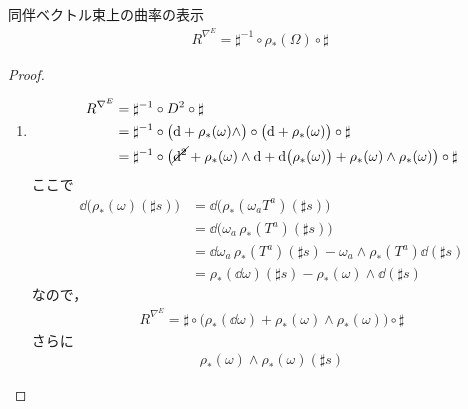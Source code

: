 \documentclass[TQFT_main]{subfiles}
\begin{document}
\begin{mytheo}[label=thm:curvature-assoc]{同伴ベクトル束上の曲率の表示}
    \begin{align}
        R^{\nabla^E} = \sharp^{-1} \circ \rho_*(\Omega) \circ \sharp
    \end{align}
\end{mytheo}

\begin{proof}
    \begin{enumerate}
        \item 
        \begin{align}
            R^{\nabla^E}
            &= \sharp^{-1} \circ D^2 \circ \sharp \\
            &= \sharp^{-1} \circ \bigl( \dd + \rho_*(\omega) \wedge \bigr)\circ \bigl( \dd + \rho_*(\omega)\bigr) \circ \sharp \\
            &= \sharp^{-1} \circ \bigl( \cancel{\dd^2} + \rho_*(\omega) \wedge \dd + \dd{\bigl( \rho_*(\omega) \bigr)} + \rho_*(\omega) \wedge \rho_*(\omega) \bigr) \circ \sharp
        \end{align}
        ここで
        \begin{align}
            \dd{\bigl( \rho_*(\omega)(\sharp s) \bigr) }
            &= \dd{\bigl( \rho_*(\omega_a T^a)(\sharp s) \bigr) } \\
            &= \dd{\bigl(\omega_a \,\rho_*(T^a)(\sharp s) \bigr) } \\
            &= \dd{\omega_a}\, \rho_*(T^a)(\sharp s) - \omega_a\wedge \rho_*(T^a)\dd{(\sharp s)} \\
            &= \rho_*(\dd{\omega})(\sharp s) - \rho_*(\omega) \wedge \dd{(\sharp s)}
        \end{align}
        なので，
        \begin{align}
            R^{\nabla^E} = \sharp \circ \bigl( \rho_*(\dd{\omega}) + \rho_*(\omega) \wedge \rho_*(\omega)\bigr) \circ \sharp
        \end{align}
        さらに
        \begin{align}
            \rho_*(\omega) \wedge \rho_*(\omega)(\sharp s)

\end{align}
\end{enumerate}
\end{proof}
\end{document}
